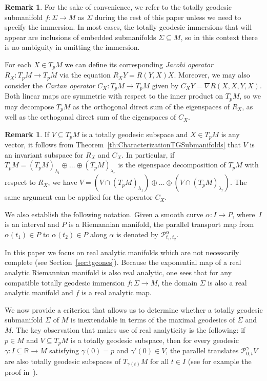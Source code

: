 \documentclass[11pt,a4paper,final]{amsart}
\newcommand{\R}{\mathbb{R}}
\theoremstyle{definition}
\newtheorem{remark}[theorem]{Remark}
\begin{document}
\begin{remark}
	For the sake of convenience, we refer to the totally geodesic submanifold \linebreak$f\colon \Sigma \to M$ as $\Sigma$ during the rest of this paper unless we need to specify the immersion.
	In most cases, the totally geodesic immersions that will appear are inclusions of embedded submanifolds $\Sigma\subseteq M$, so in this context there is no ambiguity in omitting the immersion. 
\end{remark}
\color{black}

For each $X\in T_{p}M$ we can define its corresponding \textit{Jacobi operator} $R_{X}\colon T_{p}M\to T_{p}M$ via the equation $R_{X}Y=R(Y,X)X$.
Moreover, we may also consider the \textit{Cartan operator} $C_{X}\colon T_{p}M\to T_{p}M$ given by $C_{X}Y=\nabla R(X,X,Y,X)$.
Both linear maps are symmetric with respect to the inner product on $T_{p}M$, so we may decompose $T_{p}M$ as the orthogonal direct sum of the eigenspaces of $R_{X}$, as well as the orthogonal direct sum of the eigenspaces of $C_{X}$.

\begin{remark}\label{remark:JacobiInvariance}
	If $V\subseteq T_{p}M$ is a totally geodesic subspace and $X\in T_{p}M$ is any vector, it follows from Theorem~\ref{th:CharacterizationTGSubmanifolds} that $V$ is an invariant subspace for $R_{X}$ and $C_{X}$.
	In particular, if $T_{p}M=(T_{p}M)_{\lambda_{1}}\oplus\dots\oplus (T_{p}M)_{\lambda_{r}}$ is the eigenspace decomposition of $T_{p}M$ with respect to $R_{X}$, we have $V=(V\cap (T_{p}M)_{\lambda_{1}})\oplus \dots \oplus (V\cap (T_{p}M)_{\lambda_{r}})$. 
	The same argument can be applied for the operator $C_{X}$.
\end{remark}	

We also establish the following notation.
Given a smooth curve $\alpha\colon I\to P$, where~$I$ is an interval and $P$ is a Riemannian manifold, the parallel transport map from $\alpha(t_{1})\in P$ to $\alpha(t_{2})\in P$ along $\alpha$ is denoted by $\mathcal{P}_{t_{1},t_{2}}^{\alpha}$.

In this paper we focus on real analytic manifolds which are not necessarily complete (see Section~\ref{sec:tgcones}).
Because the exponential map of a real analytic Riemannian manifold is also real analytic, one sees that for any compatible totally geodesic immersion $f\colon \Sigma\to M$, the domain $\Sigma$ is also a real analytic manifold and $f$ is a real analytic map.

We now provide a criterion that allows us to determine whether a totally geodesic submanifold $\Sigma$ of $M$ is inextendable in terms of the maximal geodesics of $\Sigma$ and $M$.
The key observation that makes use of real analyticity is the following:
if $p\in M$ and $V\subseteq T_{p}M$ is a totally geodesic subspace, then for every geodesic $\gamma\colon I\subseteq \R\to M$ satisfying $\gamma(0)=p$ and $\gamma'(0)\in V$, the parallel translates $\mathcal{P}_{0,t}^{\gamma}V$ are also totally geodesic subspaces of $T_{\gamma(t)}M$ for all $t\in I$ (see for example the proof in~\cite[Corollary~3.7]{Tsukada}).
\end{document}
